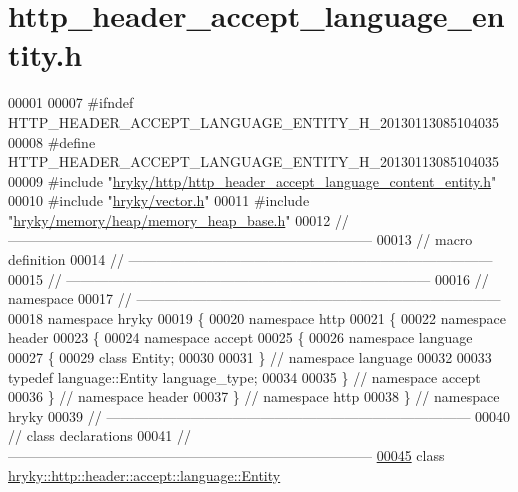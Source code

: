 \hypertarget{http__header__accept__language__entity_8h_source}{\section{http\-\_\-header\-\_\-accept\-\_\-language\-\_\-entity.\-h}
}

\begin{DoxyCode}
00001 
00007 \textcolor{preprocessor}{#ifndef HTTP\_HEADER\_ACCEPT\_LANGUAGE\_ENTITY\_H\_20130113085104035}
00008 \textcolor{preprocessor}{}\textcolor{preprocessor}{#define HTTP\_HEADER\_ACCEPT\_LANGUAGE\_ENTITY\_H\_20130113085104035}
00009 \textcolor{preprocessor}{}\textcolor{preprocessor}{#include "\hyperlink{http__header__accept__language__content__entity_8h}{hryky/http/http_header_accept_language_content_entity.h}"}
00010 \textcolor{preprocessor}{#include "\hyperlink{vector_8h}{hryky/vector.h}"}
00011 \textcolor{preprocessor}{#include "\hyperlink{memory__heap__base_8h}{hryky/memory/heap/memory_heap_base.h}"}
00012 \textcolor{comment}{//
      ------------------------------------------------------------------------------}
00013 \textcolor{comment}{// macro definition}
00014 \textcolor{comment}{//
      ------------------------------------------------------------------------------}
00015 \textcolor{comment}{//
      ------------------------------------------------------------------------------}
00016 \textcolor{comment}{// namespace}
00017 \textcolor{comment}{//
      ------------------------------------------------------------------------------}
00018 \textcolor{keyword}{namespace }hryky
00019 \{
00020 \textcolor{keyword}{namespace }http
00021 \{
00022 \textcolor{keyword}{namespace }header
00023 \{
00024 \textcolor{keyword}{namespace }accept
00025 \{
00026 \textcolor{keyword}{namespace }language
00027 \{
00029     \textcolor{keyword}{class }Entity;
00030 
00031 \} \textcolor{comment}{// namespace language}
00032 
00033 \textcolor{keyword}{typedef} language::Entity language\_type;
00034 
00035 \} \textcolor{comment}{// namespace accept}
00036 \} \textcolor{comment}{// namespace header}
00037 \} \textcolor{comment}{// namespace http}
00038 \} \textcolor{comment}{// namespace hryky}
00039 \textcolor{comment}{//
      ------------------------------------------------------------------------------}
00040 \textcolor{comment}{// class declarations}
00041 \textcolor{comment}{//
      ------------------------------------------------------------------------------}
\hypertarget{http__header__accept__language__entity_8h_source_l00045}{}\hyperlink{classhryky_1_1http_1_1header_1_1accept_1_1language_1_1_entity}{00045} \textcolor{comment}{}\textcolor{keyword}{class }\hyperlink{classhryky_1_1http_1_1header_1_1accept_1_1language_1_1_entity}{hryky::http::header::accept::language::Entity}

\end{DoxyCode}
